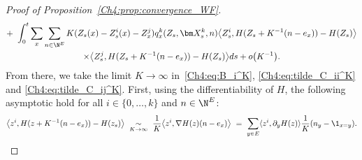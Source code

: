 \begin{refsegment}
\begin{proof}[Proof of Proposition~\ref{Ch4:prop:convergence_WF}]
\begin{multline}
  + \int_{0}^t \sum_{x}\sum_{n\in \N^E}K(Z_s(x) -  Z^i_s(x)- Z^j_x)q^k_x(Z_s,\bm X^k_s, n)\big\langle Z^i_s, H(Z_s+ K^{-1}(n -e_x)) - H(Z_s) \big\rangle \\
  \times
    \big\langle Z^j_s, H(Z_s+ K^{-1}(n -e_x)) - H(Z_s) \big\rangle ds +  o\big(K^{-1}\big).
\end{multline}
From there, we take the limit $K\to\infty$ in~\eqref{Ch4:eq:B_i^K}, \eqref{Ch4:eq:tilde_C_ii^K} and \eqref{Ch4:eq:tilde_C_ij^K}. First, using the differentiability of $H$, the following asymptotic hold for all $i\in\{0,\dots, k\}$ and $n\in \N^E$:
\[
\big\langle z^i, H(z+ K^{-1}(n-e_x)) - H(z_s) \big\rangle\ \underset{K\to\infty}{\sim}\ \frac{1}{K}\big\langle  z^i,  \nabla H(z) (n -e_x) \big\rangle\ =\ \sum_{y\in E} \langle  z^i,  \partial_y H(z)  \rangle \frac{1}{K}(n_y- \1_{x=y}).
\]
\end{proof}
\end{refsegment}
